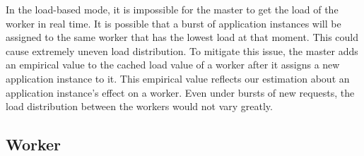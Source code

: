In the load-based mode, it is impossible for the master to get
the load of the worker in real time.
It is possible that a burst of application instances will 
be assigned to the same worker that has the lowest load at that moment.
This could cause extremely uneven load distribution.
To mitigate this issue, the master adds an empirical value to the cached
load value of a worker after it assigns a new application instance to it.
This empirical value reflects our estimation about an application instance's 
effect on a worker.
Even under bursts of new requests, 
the load distribution between the workers would not vary greatly.


\subsection{Worker}


